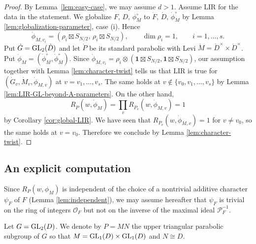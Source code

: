 \documentclass[11pt,reqno]{amsart}
\theoremstyle{plain}
\theoremstyle{definition}
\newcommand{\cO}{\mathcal{O}}
\newcommand{\cP}{\mathcal{P}}
\newcommand{\GL}{\tu{GL}}
\newcommand{\triv}{{\mathbf{1}}}
\newcommand{\tu}{\textup}
\numberwithin{equation}{subsection}
\begin{document}
\begin{proof}
By Lemma~\ref{lem:easy-case}, we may assume $d>1$.
Assume LIR for the data in the statement.
We globalize $F$, $D$, $\phi_M^\circ$ to $\dot F$, $\dot D$, $\dot\phi_M^\circ$ by Lemma \ref{lem:globalization-parameter}, case (i). 
Hence 
\[\dot \phi_{M,v_i}=(\rho_i\boxtimes S_{N/2},\,\rho_i\boxtimes S_{N/2}),\qquad \dim \rho_i=1,\qquad i=1,...,s.
\]
Put $\dot G=\GL_2(\dot D)$ and let $\dot P$ be its standard parabolic
with Levi $\dot M=\dot D^\times\times\dot D^\times$. Put
$\dot\phi_M=(\dot\phi_M^\circ,\dot\phi_M^\circ)$.
Since $\dot \phi_{M,v_i}=\rho_i\otimes (\triv\boxtimes S_{N/2},\triv\boxtimes S_{N/2})$, our assumption together with Lemma \ref{lem:character-twist} tells us that LIR is true for $(\dot G_{v},\dot M_{v},\dot\phi_{M,v})$ at $v=v_1,...,v_s$. The same holds at $v\notin \{v_0,v_1,...,v_s\}$ by Lemma \ref{lem:LIR-GL-beyond-A-parameters}. On the other hand, 
\[
R_{\dot P}(w,\dot \phi_M)=\textstyle\prod_v R_{\dot P_v}(w,\dot \phi_{M,v})=1
\]
by Corollary \ref{cor:global-LIR}. We have seen that $R_{\dot P_v}(w,\dot \phi_{M,v})=1$ for $v\neq v_0$, so the same holds at $v=v_0$. Therefore we conclude by Lemma \ref{lem:character-twist}.
\end{proof}

\subsection{An explicit computation}
Since $R_P(w,\phi_M)$ is independent of 
the choice of a nontrivial additive character $\psi_F$ of $F$ (Lemma \ref{lem:independent}), 
we may assume hereafter that $\psi_F$ is trivial on the ring of integers $\cO_F$ but not on the inverse of the maximal ideal $\cP_F^{-1}$.
\par

Let $G = \GL_2(D)$. 
We denote by $P = MN$ the upper triangular parabolic subgroup of $G$ so that $M = \GL_1(D) \times \GL_1(D)$
and $N \cong D$. 
\end{document}
